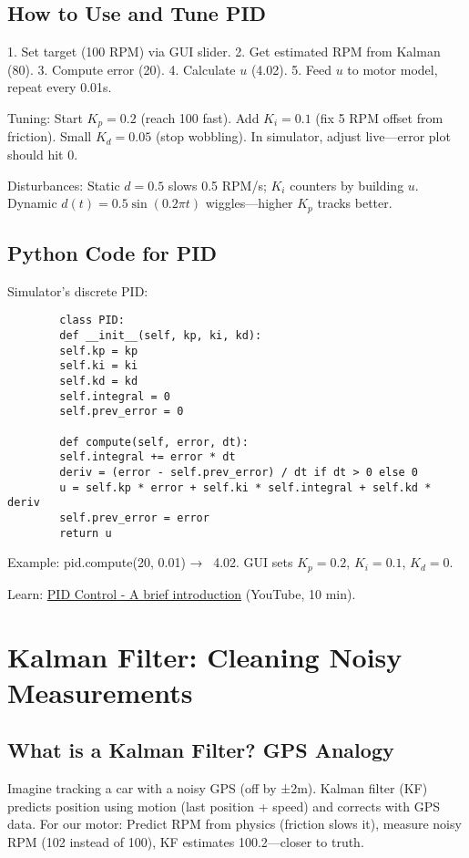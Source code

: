 \documentclass[conference]{IEEEtran}
\begin{document}
	\subsection{How to Use and Tune PID}
	1. Set target (100 RPM) via GUI slider.
	2. Get estimated RPM from Kalman (80).
	3. Compute error (20).
	4. Calculate $u$ (4.02).
	5. Feed $u$ to motor model, repeat every 0.01s.
	
	Tuning: Start $K_p=0.2$ (reach 100 fast). Add $K_i=0.1$ (fix 5 RPM offset from friction). Small $K_d=0.05$ (stop wobbling). In simulator, adjust live—error plot should hit 0.
	
	Disturbances: Static $d=0.5$ slows 0.5 RPM/s; $K_i$ counters by building $u$. Dynamic $d(t)=0.5 \sin(0.2\pi t)$ wiggles—higher $K_p$ tracks better.
	
	\subsection{Python Code for PID}
	Simulator's discrete PID:
	
	\begin{lstlisting}
		class PID:
		def __init__(self, kp, ki, kd):
		self.kp = kp
		self.ki = ki
		self.kd = kd
		self.integral = 0
		self.prev_error = 0
		
		def compute(self, error, dt):
		self.integral += error * dt
		deriv = (error - self.prev_error) / dt if dt > 0 else 0
		u = self.kp * error + self.ki * self.integral + self.kd * deriv
		self.prev_error = error
		return u
	\end{lstlisting}
	
	Example: pid.compute(20, 0.01) → ~4.02. GUI sets $K_p=0.2$, $K_i=0.1$, $K_d=0$.
	
	Learn: \href{https://www.youtube.com/watch?v=UR0hOmjaHp0}{PID Control - A brief introduction} (YouTube, 10 min).
	
	\section{Kalman Filter: Cleaning Noisy Measurements}
	\label{sec:kf}
	
	\subsection{What is a Kalman Filter? GPS Analogy}
	Imagine tracking a car with a noisy GPS (off by ±2m). Kalman filter (KF) predicts position using motion (last position + speed) and corrects with GPS data. For our motor: Predict RPM from physics (friction slows it), measure noisy RPM (102 instead of 100), KF estimates 100.2—closer to truth.
	
\end{document}

